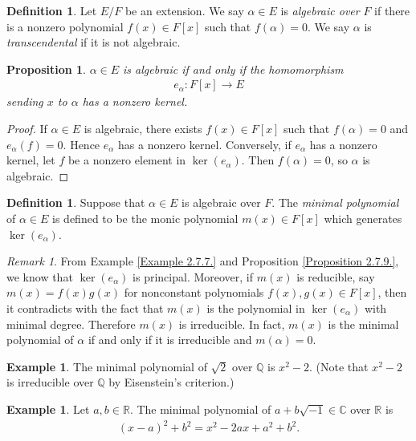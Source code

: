 \documentclass[12pt]{report}
\theoremstyle{plain}
\newtheorem{proposition}[theorem]{Proposition}
\theoremstyle{remark}
\newtheorem*{remark}{Remark}
\theoremstyle{definition}
\newtheorem{definition}[theorem]{Definition}
\newtheorem{example}[theorem]{Example}
\newcommand{\Q}{\mathbb{Q}}
\newcommand{\R}{\mathbb{R}}
\newcommand{\C}{\mathbb{C}}
\begin{document}
\begin{definition}
    Let $E/F$ be an extension. We say $\alpha\in E$ is \emph{algebraic over} $F$ if there is a nonzero polynomial $f(x)\in F[x]$ such that $f(\alpha)=0$. We say $\alpha$ is \emph{transcendental} if it is not algebraic.
\end{definition}

\begin{proposition}
    $\alpha\in E$ is algebraic if and only if the homomorphism
    \begin{align*}
        e_\alpha:F[x]\rightarrow E
    \end{align*}
    sending $x$ to $\alpha$ has a nonzero kernel.
\end{proposition}
\begin{proof}
    If $\alpha\in E$ is algebraic, there exists $f(x)\in F[x]$ such that $f(\alpha)=0$ and $e_\alpha(f)=0$. Hence $e_\alpha$ has a nonzero kernel. Conversely, if $e_\alpha$ has a nonzero kernel, let $f$ be a nonzero element in $\ker(e_\alpha)$. Then $f(\alpha)=0$, so $\alpha$ is algebraic.
\end{proof}

\begin{definition}
    Suppose that $\alpha\in E$ is algebraic over $F$. The \emph{minimal polynomial} of $\alpha\in E$ is defined to be the monic polynomial $m(x)\in F[x]$ which generates $\ker(e_\alpha)$.
\end{definition}
\begin{remark}
    From Example \ref{Example 2.7.7.} and Proposition \ref{Proposition 2.7.9.}, we know that $\ker(e_\alpha)$ is principal. Moreover, if $m(x)$ is reducible, say $m(x)=f(x)g(x)$ for nonconstant polynomials $f(x),g(x)\in F[x]$, then it contradicts with the fact that $m(x)$ is the polynomial in $\ker(e_\alpha)$ with minimal degree. Therefore $m(x)$ is irreducible. In fact, $m(x)$ is the minimal polynomial of $\alpha$ if and only if it is irreducible and $m(\alpha)=0$.
\end{remark}

\begin{example}
    The minimal polynomial of $\sqrt{2}$ over $\Q$ is $x^2-2$. (Note that $x^2-2$ is irreducible over $\Q$ by Eisenstein's criterion.)
\end{example}

\begin{example}
    Let $a,b\in \R$. The minimal polynomial of $a+b\sqrt{-1}\in \C$ over $\R$ is
    \begin{align*}
        (x-a)^2+b^2=x^2-2ax+a^2+b^2.
    \end{align*}
\end{example}
\end{document}
